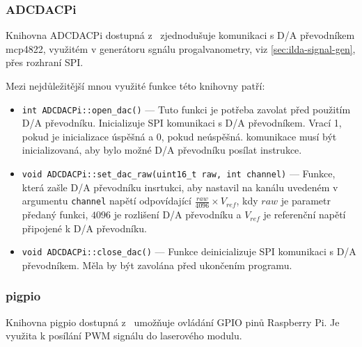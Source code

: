 \subsubsection{ADCDACPi}
Knihovna ADCDACPi dostupná z~\cite{ADCDACPi} zjednodušuje komunikaci s D/A převodníkem mcp4822, využitém v generátoru sgnálu progalvanometry, viz \ref{sec:ilda-signal-gen}, přes rozhraní SPI.

Mezi nejdůležitější mnou využité funkce této knihovny patří:
\begin{itemize}
  \item \texttt{int ADCDACPi::open_dac()} --- Tuto funkci je potřeba zavolat před použitím D/A převodníku. Inicializuje SPI komunikaci s D/A převodníkem. Vrací 1, pokud je inicializace úspěšná a 0, pokud neúspěšná. komunikace musí být inicializovaná, aby bylo možné D/A převodníku posílat instrukce.
  \item \texttt{void ADCDACPi::set_dac_raw(uint16_t raw, int channel)} --- Funkce, která zašle D/A převodníku insrtukci, aby nastavil na kanálu uvedeném v argumentu \texttt{channel} napětí odpovídající $\frac{raw}{4096} \times V_{ref}$, kdy $raw$ je parametr předaný funkci, $4096$ je rozlišení D/A převodníku a $V_{ref}$ je referenční napětí připojené k D/A převodníku.
  \item \texttt{void ADCDACPi::close_dac()} --- Funkce deinicializuje SPI komunikaci s D/A převodníkem. Měla by být zavolána před ukončením programu.
\end{itemize}
\subsubsection{pigpio}
Knihovna pigpio dostupná z~\cite{pigpio} umožňuje ovládání GPIO pinů Raspberry Pi. Je využita k posílání PWM signálu do laserového modulu.

